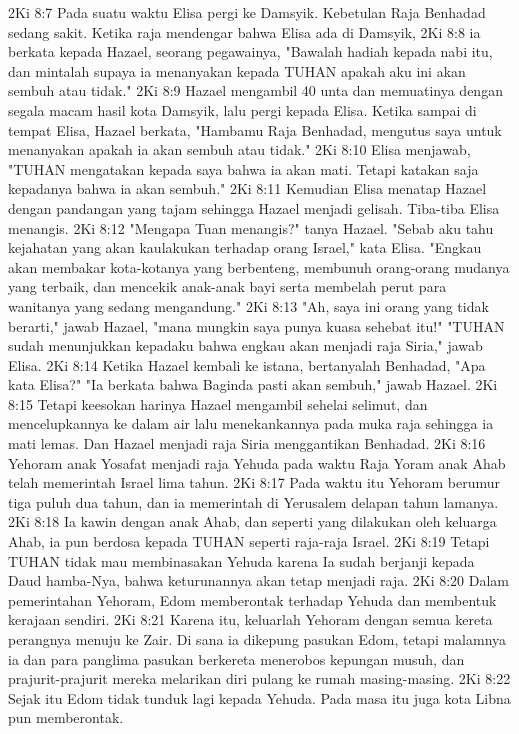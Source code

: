 2Ki 8:7  Pada suatu waktu Elisa pergi ke Damsyik. Kebetulan Raja Benhadad sedang sakit. Ketika raja mendengar bahwa Elisa ada di Damsyik,
2Ki 8:8  ia berkata kepada Hazael, seorang pegawainya, "Bawalah hadiah kepada nabi itu, dan mintalah supaya ia menanyakan kepada TUHAN apakah aku ini akan sembuh atau tidak."
2Ki 8:9  Hazael mengambil 40 unta dan memuatinya dengan segala macam hasil kota Damsyik, lalu pergi kepada Elisa. Ketika sampai di tempat Elisa, Hazael berkata, "Hambamu Raja Benhadad, mengutus saya untuk menanyakan apakah ia akan sembuh atau tidak."
2Ki 8:10  Elisa menjawab, "TUHAN mengatakan kepada saya bahwa ia akan mati. Tetapi katakan saja kepadanya bahwa ia akan sembuh."
2Ki 8:11  Kemudian Elisa menatap Hazael dengan pandangan yang tajam sehingga Hazael menjadi gelisah. Tiba-tiba Elisa menangis.
2Ki 8:12  "Mengapa Tuan menangis?" tanya Hazael. "Sebab aku tahu kejahatan yang akan kaulakukan terhadap orang Israel," kata Elisa. "Engkau akan membakar kota-kotanya yang berbenteng, membunuh orang-orang mudanya yang terbaik, dan mencekik anak-anak bayi serta membelah perut para wanitanya yang sedang mengandung."
2Ki 8:13  "Ah, saya ini orang yang tidak berarti," jawab Hazael, "mana mungkin saya punya kuasa sehebat itu!" "TUHAN sudah menunjukkan kepadaku bahwa engkau akan menjadi raja Siria," jawab Elisa.
2Ki 8:14  Ketika Hazael kembali ke istana, bertanyalah Benhadad, "Apa kata Elisa?" "Ia berkata bahwa Baginda pasti akan sembuh," jawab Hazael.
2Ki 8:15  Tetapi keesokan harinya Hazael mengambil sehelai selimut, dan mencelupkannya ke dalam air lalu menekankannya pada muka raja sehingga ia mati lemas. Dan Hazael menjadi raja Siria menggantikan Benhadad.
2Ki 8:16  Yehoram anak Yosafat menjadi raja Yehuda pada waktu Raja Yoram anak Ahab telah memerintah Israel lima tahun.
2Ki 8:17  Pada waktu itu Yehoram berumur tiga puluh dua tahun, dan ia memerintah di Yerusalem delapan tahun lamanya.
2Ki 8:18  Ia kawin dengan anak Ahab, dan seperti yang dilakukan oleh keluarga Ahab, ia pun berdosa kepada TUHAN seperti raja-raja Israel.
2Ki 8:19  Tetapi TUHAN tidak mau membinasakan Yehuda karena Ia sudah berjanji kepada Daud hamba-Nya, bahwa keturunannya akan tetap menjadi raja.
2Ki 8:20  Dalam pemerintahan Yehoram, Edom memberontak terhadap Yehuda dan membentuk kerajaan sendiri.
2Ki 8:21  Karena itu, keluarlah Yehoram dengan semua kereta perangnya menuju ke Zair. Di sana ia dikepung pasukan Edom, tetapi malamnya ia dan para panglima pasukan berkereta menerobos kepungan musuh, dan prajurit-prajurit mereka melarikan diri pulang ke rumah masing-masing.
2Ki 8:22  Sejak itu Edom tidak tunduk lagi kepada Yehuda. Pada masa itu juga kota Libna pun memberontak.
